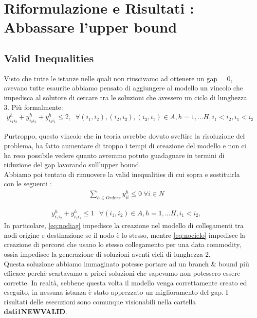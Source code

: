 \documentclass{article}
\begin{document}
\section{Riformulazione e Risultati : Abbassare l'upper bound}

\subsection{Valid Inequalities}
Visto che tutte le istanze nelle quali non riuscivamo ad ottenere un gap = 0, avevano tutte esaurite abbiamo pensato di aggiungere al modello un vincolo che impedisca al solutore di cercare tra le soluzioni che avessero un ciclo di lunghezza 3. Più formalmente:
\begin{align}
    y_{i_{1}i_{2}}^h + y_{i_{2}i_{3}}^h + y_{i_{3}i_{1}}^h \leq 2, \; \;
    \forall (i_1,i_2), (i_2,i_3), (i_3,i_1)   \in A , h=1, ... H,
    i_1 < i_2, i_1 < i_3
\end{align}

Purtroppo, questo vincolo che in teoria avrebbe dovuto sveltire la risoluzione del problema, ha fatto aumentare di troppo i tempi di creazione del modello e non ci ha reso possibile vedere quanto avremmo potuto guadagnare in termini di riduzione del gap lavorando sull'upper bound.
\\
Abbiamo poi tentato di rimuovere la valid inequalities di cui sopra e sostituirla con le seguenti :
\begin{align}
   \sum_{ h \in Orders}y_{ii}^h \leq 0 \; \forall i \in N
   \label{eq:nodiag}
\end{align}

\begin{align}
   y_{i_{1}i_{2}}^h + y_{i_{2}i_{1}}^h \leq 1\, \; \;
    \forall (i_1,i_2)  \in A , h=1, ... H,
    i_1 < i_2,
    \label{eq:nociclo}
\end{align}
In particolare, \cref{eq:nodiag} impedisce la creazione nel modello di collegamenti tra nodi origine e destinazione se il nodo è lo stesso, mentre \cref{eq:nociclo} impedisce la creazione di percorsi che usano lo stesso collegamento per una data commodity, ossia impedisce la generazione di soluzioni aventi cicli di lunghezza 2.
\\
Questa soluzione abbiamo immaginato potesse portare ad un branch \& bound più efficace perchè scartavamo a priori soluzioni che sapevamo non potessero essere corrette. In realtà, sebbene questa volta il modello venga correttamente creato ed eseguito, in nessuna istanza è stato apprezzato un miglioramento del gap.
I risultati delle esecuzioni sono comunque visionabili nella cartella \textbf{dati1NEWVALID}.
\end{document}
